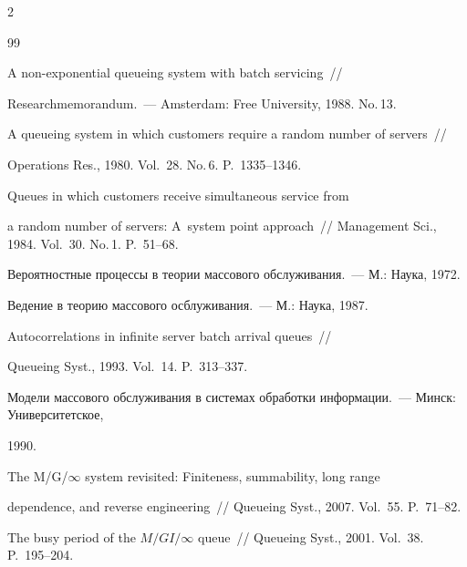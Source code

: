 \begin{multicols}{2}
{{\begin{thebibliography}{99}

 A non-exponential queueing system with batch servicing~// 

Researchmemorandum.~--- Amsterdam: Free University, 1988. No.\,13.




 A queueing system in which customers require a random number of servers~// 

Operations Res., 1980. Vol.~28. No.\,6. P.~1335--1346.




 Queues in which customers receive simultaneous service from 

a random number of servers: A~system point approach~// Management Sci., 1984. Vol.~30. No.\,1. P.~51--68.




 Вероятностные процессы в теории массового обслуживания.~---  М.: Наука, 1972.




 Ведение в теорию массового осблуживания.~--- М.: Наука, 1987.




 Autocorrelations in infinite server batch arrival queues~// 

Queueing Syst., 1993. Vol.~14. P.~313--337.




 Модели массового обслуживания в системах обработки информации.~--- Минск: Университетское,

1990.




 The M/G/$\infty$ system revisited: Finiteness, summability, long range 

dependence, and reverse engineering~// Queueing Syst., 2007. Vol.~55. P.~71--82.




 The busy period of the $M/GI/\infty$ queue~// Queueing Syst., 2001. Vol.~38. P.~195--204.




\end{thebibliography}}}
\end{multicols}
